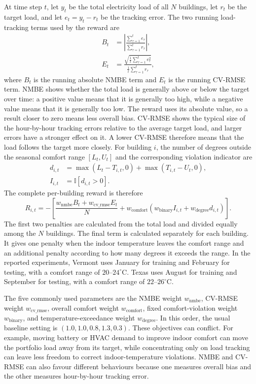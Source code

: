 At time step $t$, let $y_t$ be the total electricity load of all $N$
buildings, let $r_t$ be the target load, and let $e_t=y_t-r_t$ be the tracking
error. The two running load-tracking terms used by the reward are
\begin{align}
B_t &= \left|\frac{\sum_{\tau=1}^{t}e_\tau}
{\sum_{\tau=1}^{t}r_\tau}\right|,\\
E_t &= \frac{\sqrt{\frac{1}{t}\sum_{\tau=1}^{t}e_\tau^2}}
{\frac{1}{t}\sum_{\tau=1}^{t}r_\tau},
\end{align}
where $B_t$ is the running absolute NMBE term and $E_t$ is the running
CV-RMSE term. NMBE shows whether the total load is generally above or below the
target over time: a positive value means that it is generally too high, while a
negative value means that it is generally too low. The reward uses its absolute
value, so a result closer to zero means less overall bias. CV-RMSE shows
the typical size of the hour-by-hour tracking errors relative to the average
target load, and larger errors have a stronger effect on it. A lower CV-RMSE
therefore means that the load follows the target more closely. For building $i$,
the number of degrees outside the seasonal comfort range $[L_t,U_t]$ and the
corresponding violation indicator are
\begin{align}
d_{i,t} &= \max(L_t-T_{i,t},0)+\max(T_{i,t}-U_t,0),\\
I_{i,t} &= \mathbb{I}[d_{i,t}>0].
\end{align}
The complete per-building reward is therefore
\begin{equation}
\label{eq:report2-reward}
R_{i,t}=-\left[
\frac{w_{\mathrm{nmbe}}B_t+w_{\mathrm{cv\_rmse}}E_t}{N}
+w_{\mathrm{comfort}}
\left(w_{\mathrm{binary}}I_{i,t}+w_{\mathrm{degree}}d_{i,t}\right)
\right].
\end{equation}
The first two penalties are calculated from the total load and divided equally
among the $N$ buildings. The final term is calculated separately for each
building. It gives one penalty when the indoor temperature leaves the comfort
range and an additional penalty according to how many degrees it exceeds the
range. In the reported experiments, Vermont uses January for training and
February for testing, with a comfort range of $20$--$24^{\circ}$C. Texas uses
August for training and September for testing, with a comfort range of
$22$--$26^{\circ}$C.

The five commonly used parameters are the NMBE weight
$w_{\mathrm{nmbe}}$, CV-RMSE weight $w_{\mathrm{cv\_rmse}}$, overall comfort weight
$w_{\mathrm{comfort}}$, fixed comfort-violation weight
$w_{\mathrm{binary}}$, and temperature-exceedance weight
$w_{\mathrm{degree}}$. In this order, the usual baseline setting is
$(1.0,1.0,0.8,1.3,0.3)$. These objectives can conflict. For example, moving
battery or HVAC demand to improve indoor comfort can move the portfolio load
away from its target, while concentrating only on load tracking can leave less
freedom to correct indoor-temperature violations. NMBE and CV-RMSE can also
favour different behaviours because one measures overall bias and the other
measures hour-by-hour tracking error.

